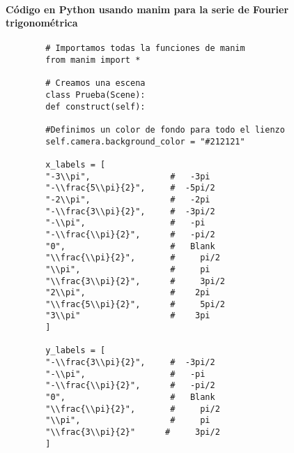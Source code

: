 \paragraph{Código en Python usando manim para la serie de Fourier trigonométrica} \label{app3:trig-code-python-manim}
\begin{longlisting}
	\begin{verbatim}
		# Importamos todas la funciones de manim
		from manim import *
		
		# Creamos una escena
		class Prueba(Scene):
		def construct(self):
		
		#Definimos un color de fondo para todo el lienzo
		self.camera.background_color = "#212121" 
		
		x_labels = [
		"-3\\pi",                #   -3pi
		"-\\frac{5\\pi}{2}",     #  -5pi/2
		"-2\\pi",                #   -2pi
		"-\\frac{3\\pi}{2}",     #  -3pi/2
		"-\\pi",                 #   -pi
		"-\\frac{\\pi}{2}",      #   -pi/2
		"0",                     #   Blank
		"\\frac{\\pi}{2}",       #     pi/2
		"\\pi",                  #     pi
		"\\frac{3\\pi}{2}",      #     3pi/2
		"2\\pi",                 #    2pi
		"\\frac{5\\pi}{2}",      #     5pi/2
		"3\\pi"                  #    3pi
		]
		
		y_labels = [
		"-\\frac{3\\pi}{2}",     #  -3pi/2
		"-\\pi",                 #   -pi
		"-\\frac{\\pi}{2}",      #   -pi/2
		"0",                     #   Blank
		"\\frac{\\pi}{2}",       #     pi/2
		"\\pi",                  #     pi
		"\\frac{3\\pi}{2}"      #     3pi/2	
		]
		

\end{verbatim}
\end{longlisting}
